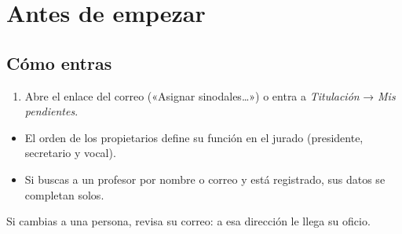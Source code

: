 \section{Antes de empezar}
\subsection*{Cómo entras}
\begin{enumerate}
  \item Abre el enlace del correo («Asignar sinodales…») o entra a \emph{Titulación} → \emph{Mis pendientes}.
\end{enumerate}
\begin{tencuenta}
\begin{itemize}
  \item El orden de los propietarios define su función en el jurado (presidente, secretario y vocal).
  \item Si buscas a un profesor por nombre o correo y está registrado, sus datos se completan solos.
\end{itemize}
\end{tencuenta}
\begin{algosalemal}
Si cambias a una persona, revisa su correo: a esa dirección le llega su oficio.
\end{algosalemal}
